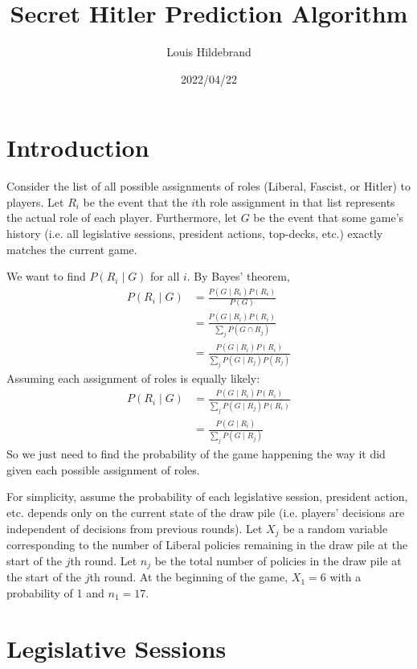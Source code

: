 \documentclass[fleqn, 12pt, letterpaper]{article}
\title{Secret Hitler Prediction Algorithm}
\author{Louis Hildebrand}
\date{2022/04/22}
\begin{document}
\maketitle

\section{Introduction}
Consider the list of all possible assignments of roles (Liberal, Fascist, or Hitler) to players. Let $R_i$ be the event that the $i$th role assignment in that list represents the actual role of each player. Furthermore, let $G$ be the event that some game's history (i.e. all legislative sessions, president actions, top-decks, etc.) exactly matches the current game.

We want to find $P(R_i \mid G)$ for all $i$. By Bayes' theorem,
\begin{align*}
	P(R_i \mid G)
		&= \frac{P(G \mid R_i) P(R_i)}{P(G)} \\
		&= \frac{P(G \mid R_i) P(R_i)}{\sum_j P(G \cap R_j)} \\
		&= \frac{P(G \mid R_i) P(R_i)}{\sum_j P(G \mid R_j) P(R_j)}
\end{align*}
Assuming each assignment of roles is equally likely:
\begin{align*}
	P(R_i \mid G)
		&= \frac{P(G \mid R_i) P(R_i)}{\sum_j P(G \mid R_j) P(R_i)} \\
		&= \frac{P(G \mid R_i)}{\sum_j P(G \mid R_j)}
\end{align*}
So we just need to find the probability of the game happening the way it did given each possible assignment of roles.

For simplicity, assume the probability of each legislative session, president action, etc. depends only on the current state of the draw pile (i.e. players' decisions are independent of decisions from previous rounds). Let $X_j$ be a random variable corresponding to the number of Liberal policies remaining in the draw pile at the start of the $j$th round. Let $n_j$ be the total number of policies in the draw pile at the start of the $j$th round. At the beginning of the game, $X_1 = 6$ with a probability of 1 and $n_1 = 17$.

\section{Legislative Sessions}
\end{document}
